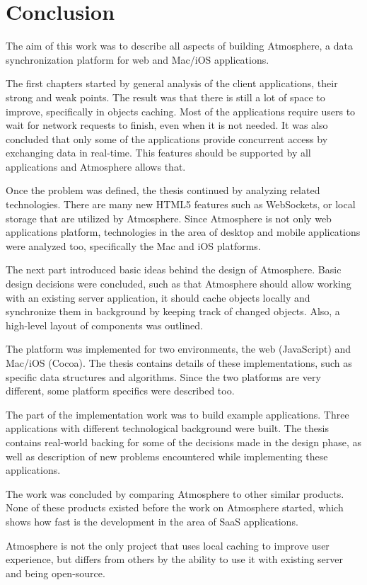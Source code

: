 \section{Conclusion}

The aim of this work was to describe all aspects of building Atmosphere, a data synchronization platform for web and Mac/iOS applications.

The first chapters started by general analysis of the client applications, their strong and weak points. The result was that there is still a lot of space to improve, specifically in objects caching. Most of the applications require users to wait for network requests to finish, even when it is not needed. It was also concluded that only some of the applications provide concurrent access by exchanging data in real-time. This features should be supported by all applications and Atmosphere allows that.

Once the problem was defined, the thesis continued by analyzing related technologies. There are many new HTML5 features such as WebSockets, or local storage that are utilized by Atmosphere. Since Atmosphere is not only web applications platform, technologies in the area of desktop and mobile applications were analyzed too, specifically the Mac and iOS platforms.

The next part introduced basic ideas behind the design of Atmosphere. Basic design decisions were concluded, such as that Atmosphere should allow working with an existing server application, it should cache objects locally and synchronize them in background by keeping track of changed objects. Also, a high-level layout of components was outlined.

The platform was implemented for two environments, the web (JavaScript) and Mac/iOS (Cocoa). The thesis contains details of these implementations, such as specific data structures and algorithms. Since the two platforms are very different, some platform specifics were described too.

The part of the implementation work was to build example applications. Three applications with different technological background were built. The thesis contains real-world backing for some of the decisions made in the design phase, as well as description of new problems encountered while implementing these applications.

The work was concluded by comparing Atmosphere to other similar products. None of these products existed before the work on Atmosphere started, which shows how fast is the development in the area of SaaS applications.

Atmosphere is not the only project that uses local caching to improve user experience, but differs from others by the ability to use it with existing server and being open-source.